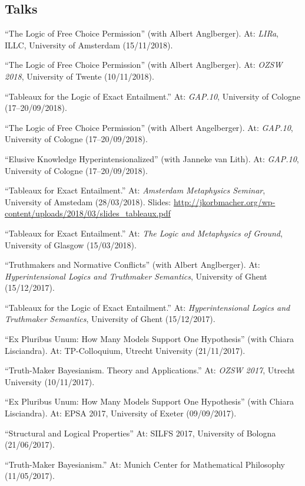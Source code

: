 \subsection*{Talks}
\begin{etaremune}
  \item ``The Logic of Free Choice Permission'' (with Albert Anglberger). At: \emph{LIRa}, ILLC, University of Amsterdam (15/11/2018).
  \item ``The Logic of Free Choice Permission'' (with Albert Anglberger). At: \emph{OZSW 2018}, University of Twente (10/11/2018).
  \item ``Tableaux for the Logic of Exact Entailment.'' At: \emph{GAP.10}, University of Cologne (17--20/09/2018).
  \item ``The Logic of Free Choice Permission'' (with Albert Angelberger). At: \emph{GAP.10}, University of Cologne (17--20/09/2018).
  \item ``Elusive Knowledge Hyperintensionalized'' (with Janneke van Lith). At: \emph{GAP.10}, University of Cologne (17--20/09/2018).
  \item ``Tableaux for Exact Entailment.'' At: \emph{Amsterdam Metaphysics Seminar}, University of Amstedam (28/03/2018). Slides: \url{http://jkorbmacher.org/wp-content/uploads/2018/03/slides_tableaux.pdf}
  \item ``Tableaux for Exact Entailment.'' At: \emph{The Logic and Metaphysics of Ground}, University of Glasgow (15/03/2018).
  \item ``Truthmakers and Normative Conflicts'' (with Albert Anglberger). At: \emph{Hyperintensional Logics and Truthmaker Semantics}, University of Ghent (15/12/2017).
  \item ``Tableaux for the Logic of Exact Entailment.'' At: \emph{Hyperintensional Logics and Truthmaker Semantics}, University of Ghent (15/12/2017).
  \item ``Ex Pluribus Unum: How Many Models Support One Hypothesis'' (with Chiara Lisciandra). At: TP-Colloquium, Utrecht University (21/11/2017).
  \item ``Truth-Maker Bayesianism. Theory and Applications.'' At: \emph{OZSW 2017}, Utrecht University (10/11/2017).
  \item ``Ex Pluribus Unum: How Many Models Support One Hypothesis'' (with Chiara Lisciandra). At: EPSA 2017, University of Exeter (09/09/2017).
  \item ``Structural and Logical Properties'' At: SILFS 2017, University of Bologna (21/06/2017).
  \item ``Truth-Maker Bayesianism.'' At: Munich Center for Mathematical Philosophy (11/05/2017).

\end{etaremune}
